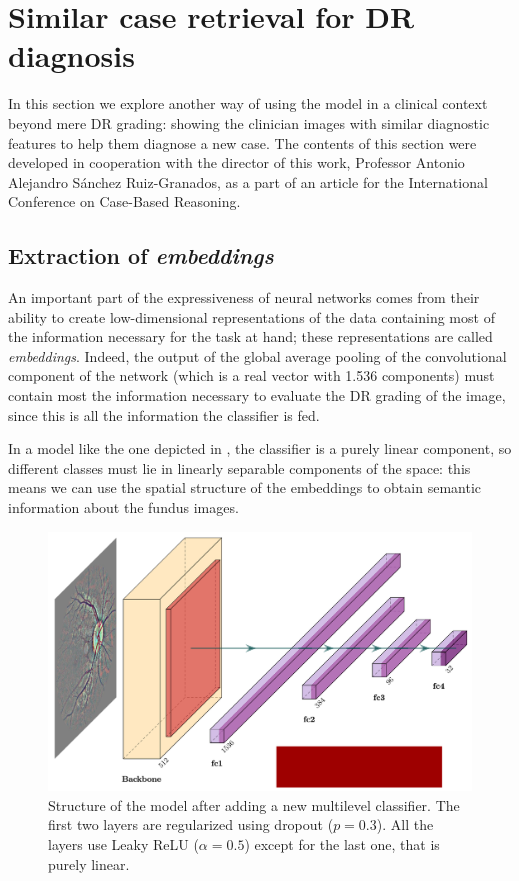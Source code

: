 \chapter{Similar case retrieval for DR diagnosis} \label{chapter6}
In this section we explore another way of using the model in a clinical context beyond mere DR grading: showing the clinician images with similar diagnostic features to help them diagnose a new case. The contents of this section were developed in cooperation with the director of this work, Professor Antonio Alejandro Sánchez Ruiz-Granados, as a part of an article for the International Conference on Case-Based Reasoning. 

\section{Extraction of \textit{embeddings}}
An important part of the expressiveness of neural networks comes from their ability to create low-dimensional representations of the data containing most of the information necessary for the task at hand; these representations are called \textit{embeddings}. Indeed, the output of the global average pooling of the convolutional component of the network (which is a real vector with 1.536 components) must contain most the information necessary to evaluate the DR grading of the image, since this is all the information the classifier is fed. 

In a model like the one depicted in , the classifier is a purely linear component, so different classes must lie in linearly separable components of the space: this means we can use the spatial structure of the embeddings to obtain semantic information about the fundus images.

\begin{figure}[tb]
    \centering
    \includegraphics[scale=0.2]{figures/chapter6/model_head.png}
    \caption{Structure of the model after adding a new multilevel classifier. The first two layers are regularized using dropout (\( p = 0.3\)). All the layers use Leaky ReLU (\( \alpha = 0.5 \)) except for the last one, that is purely linear. }
    \label{fig:model_headed}
\end{figure}

